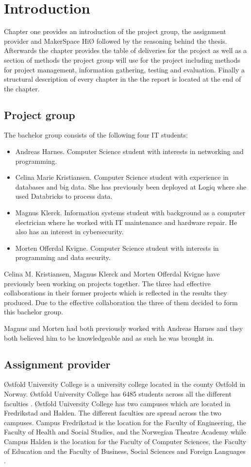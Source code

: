 \chapter{Introduction}
Chapter one provides an introduction of the project group, the assignment provider and MakerSpace HiØ followed by the reasoning behind the thesis.
Afterwards the chapter provides the table of deliveries for the project as well as a section of methods the project group will use for the project including methods for project management, information gathering, testing and evaluation.
Finally a structural description of every chapter in the the report is located at the end of the chapter.

\section{Project group}
The bachelor group consists of the following four IT students:
\begin{itemize}
    \item Andreas Harnes. 
    Computer Science student with interests in networking and programming.
    \item Celina Marie Kristiansen.
    Computer Science student with experience in databases and big data.
    She has previously been deployed at Logiq where she used Databricks to process data.
    \item Magnus Klerck.
    Information systems student with background as a computer electrician where he worked with IT maintenance and hardware repair.
    He also has an interest in cybersecurity.
    \item Morten Offerdal Kvigne.
    Computer Science student with interests in programming and data security.
\end{itemize}
Celina M. Kristiansen, Magnus Klerck and Morten Offerdal Kvigne have previously been working on projects together.
The three had effective collaborations in their former projects which is reflected in the results they produced.
Due to the effective collaboration the three of them decided to form this bachelor group.

Magnus and Morten had both previously worked with Andreas Harnes and they both believed him to be knowledgeable and as such he was brought in.

\section{Assignment provider}
Østfold University College is a university college located in the county Østfold in Norway. Østfold University College has 6485 students across all the different faculties \cite{total_stundets_at_Hiof}. Østfold University College has two campuses which are located in Fredrikstad and Halden. The different faculties are spread across the two campuses. Campus Fredrikstad is the location for the Faculty of Engineering, the Faculty of Health and Social Studies, and the Norwegian Theatre Academy while Campus Halden is the location for the Faculty of Computer Sciences, the Faculty of Education and the Faculty of Business, Social Sciences and Foreign Languages \cite{Hiof_fakta}. 

